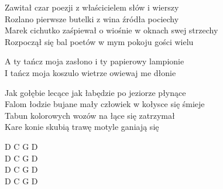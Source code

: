 \begin{text}
    \begin{footTwo}
    Zawitał czar poezji z właścicielem słów i wierszy\\
    Rozlano pierwsze butelki z wina źródła pociechy	\\
    Marek cichutko zaśpiewał o wiośnie w oknach swej strzechy\\
    Rozpoczął się bal poetów w mym pokoju gości wielu

    A ty tańcz moja zasłono i ty papierowy lampionie\\
    I tańcz moja koszulo wietrze owiewaj me dłonie

    Jak gołębie lecące jak łabędzie po jeziorze płynące\\
    Falom łodzie bujane mały człowiek w kołysce się śmieje\\
    Tabun kolorowych wozów na łące się zatrzymał\\
    Kare konie skubią trawę motyle ganiają się
    \end{footTwo}
\end{text}
\begin{chord}
    \begin{footTwo}
    D C G D\\
    D C G D\\
    D C G D\\
    D C G D
    \end{footTwo}
\end{chord}